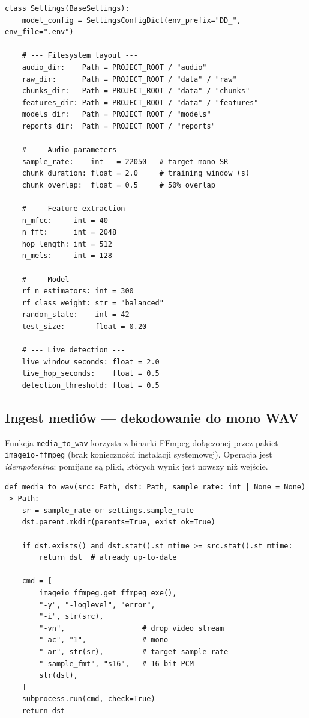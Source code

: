 \documentclass[11pt,a4paper]{article}
\begin{document}
\begin{lstlisting}[caption={Centralne parametry konfiguracyjne (\texttt{config.py}).},label={lst:config}]
class Settings(BaseSettings):
    model_config = SettingsConfigDict(env_prefix="DD_", env_file=".env")

    # --- Filesystem layout ---
    audio_dir:    Path = PROJECT_ROOT / "audio"
    raw_dir:      Path = PROJECT_ROOT / "data" / "raw"
    chunks_dir:   Path = PROJECT_ROOT / "data" / "chunks"
    features_dir: Path = PROJECT_ROOT / "data" / "features"
    models_dir:   Path = PROJECT_ROOT / "models"
    reports_dir:  Path = PROJECT_ROOT / "reports"

    # --- Audio parameters ---
    sample_rate:    int   = 22050   # target mono SR
    chunk_duration: float = 2.0     # training window (s)
    chunk_overlap:  float = 0.5     # 50% overlap

    # --- Feature extraction ---
    n_mfcc:     int = 40
    n_fft:      int = 2048
    hop_length: int = 512
    n_mels:     int = 128

    # --- Model ---
    rf_n_estimators: int = 300
    rf_class_weight: str = "balanced"
    random_state:    int = 42
    test_size:       float = 0.20

    # --- Live detection ---
    live_window_seconds: float = 2.0
    live_hop_seconds:    float = 0.5
    detection_threshold: float = 0.5
\end{lstlisting}

\subsection{Ingest mediów --- dekodowanie do mono WAV}

Funkcja \texttt{media\_to\_wav} korzysta z binarki FFmpeg dołączonej przez
pakiet \texttt{imageio-ffmpeg} (brak konieczności instalacji systemowej).
Operacja jest \emph{idempotentna}: pomijane są pliki, których wynik jest nowszy
niż wejście.

\begin{lstlisting}[caption={Dekodowanie dowolnego formatu do mono WAV 22\,050\,Hz
(\texttt{data/ingest.py}).},label={lst:ingest}]
def media_to_wav(src: Path, dst: Path, sample_rate: int | None = None) -> Path:
    sr = sample_rate or settings.sample_rate
    dst.parent.mkdir(parents=True, exist_ok=True)

    if dst.exists() and dst.stat().st_mtime >= src.stat().st_mtime:
        return dst  # already up-to-date

    cmd = [
        imageio_ffmpeg.get_ffmpeg_exe(),
        "-y", "-loglevel", "error",
        "-i", str(src),
        "-vn",                  # drop video stream
        "-ac", "1",             # mono
        "-ar", str(sr),         # target sample rate
        "-sample_fmt", "s16",   # 16-bit PCM
        str(dst),
    ]
    subprocess.run(cmd, check=True)
    return dst
\end{lstlisting}
\end{document}
